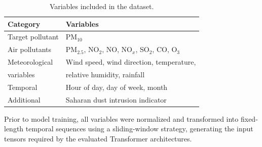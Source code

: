 \documentclass[11pt]{article}
\newenvironment{revnewblock}{%
  \begingroup\color{orange!75!black}%
}{%
  \endgroup%
}
\begin{document}
\begin{revnewblock}
\begin{table}[H]
\centering
\caption{Variables included in the dataset.}
\label{tab:variables}
\renewcommand{\arraystretch}{1.15}
\begin{tabular}{ll}
\toprule
\textbf{Category} & \textbf{Variables} \\
\midrule
Target pollutant &
PM$_{10}$ \\
\addlinespace
Air pollutants &
PM$_{2.5}$, NO$_2$, NO, NO$_x$, SO$_2$, CO, O$_3$ \\
\addlinespace
Meteorological &
Wind speed, wind direction, temperature,\\
variables &
relative humidity, rainfall \\
\addlinespace
Temporal &
Hour of day, day of week, month \\
\addlinespace
Additional &
Saharan dust intrusion indicator \\
\bottomrule
\end{tabular}
\end{table}

Prior to model training, all variables were normalized and transformed into fixed-length temporal sequences using a sliding-window strategy, generating the input tensors required by the evaluated Transformer architectures.
\end{revnewblock}

\end{document}

